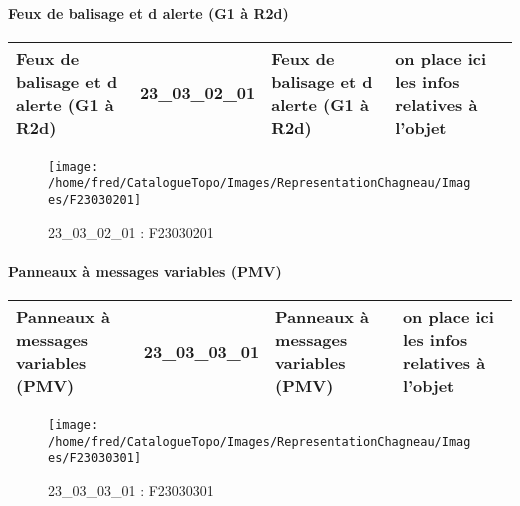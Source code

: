 \documentclass[12pt,titlepage,oneside]{book}
\begin{document}
\paragraph{Feux de balisage et d alerte (G1 à R2d)}
\noindent
\vspace{\baselineskip}

\renewcommand{\arraystretch}{1.2}
\begin{supertabular}{|p{10cm}|c|p{13cm}|p{12cm}|}
 Feux de balisage et d alerte (G1 à R2d) & 23\_03\_02\_01 & Feux de balisage et d alerte (G1 à R2d) & on place ici les infos relatives à l'objet\\
\hline
\end{supertabular}
\begin{figure}[h!]
  \hfill         %
  \begin{minipage}[t]{3cm}
    \begin{center}
      \texttt{[image: /home/fred/CatalogueTopo/Images/RepresentationChagneau/Images/F23030201]}
      \caption[F23030201]{\label{} 23\_03\_02\_01 : F23030201}
    \end{center}
  \end{minipage}
\end{figure}


\paragraph{Panneaux à messages variables (PMV)}
\noindent
\vspace{\baselineskip}

\renewcommand{\arraystretch}{1.2}
\begin{supertabular}{|p{10cm}|c|p{13cm}|p{12cm}|}
 Panneaux à messages variables (PMV) & 23\_03\_03\_01 & Panneaux à messages variables (PMV) & on place ici les infos relatives à l'objet\\
\hline
\end{supertabular}
\begin{figure}[h!]
  \hfill         %
  \begin{minipage}[t]{3cm}
    \begin{center}
      \texttt{[image: /home/fred/CatalogueTopo/Images/RepresentationChagneau/Images/F23030301]}
      \caption[F23030301]{\label{} 23\_03\_03\_01 : F23030301}
    \end{center}
  \end{minipage}
\end{figure}
\end{document}
